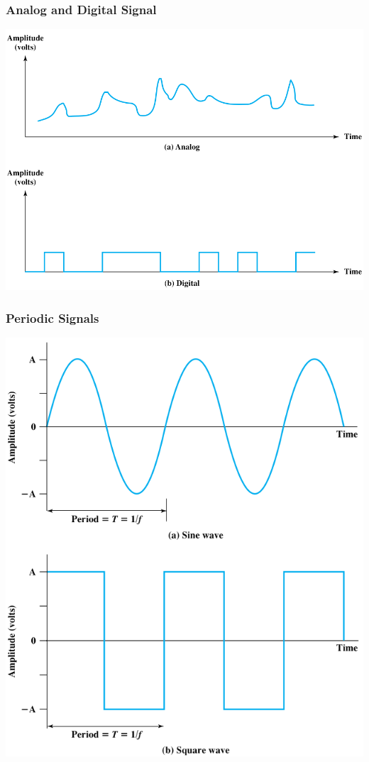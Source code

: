 \documentclass[pdflatex,compress]{beamer}
\begin{document}
\begin{frame}
	\frametitle{Analog and Digital Signal}
	\begin{center}
		\includegraphics[width=0.8\linewidth]{img/img01}
	\end{center}
\end{frame}

\begin{frame}
	\frametitle{Periodic Signals}
	\begin{center}
		\includegraphics[height=0.9\textheight]{img/img02}
	\end{center}
\end{frame}
\end{document}
